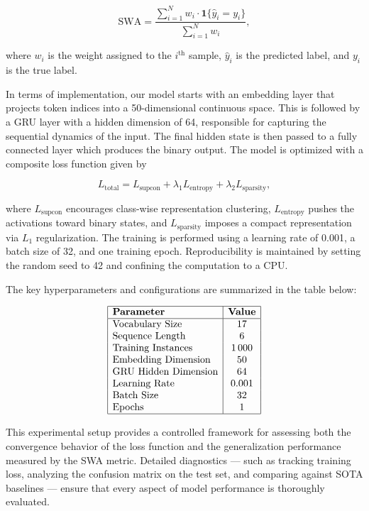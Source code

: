 \documentclass[12pt]{article}
\begin{document}
\[
\text{SWA} = \frac{\sum_{i=1}^{N} w_i \cdot \mathbf{1}\{\hat{y}_i = y_i\}}{\sum_{i=1}^{N} w_i},
\]

where \(w_i\) is the weight assigned to the \(i^\text{th}\) sample, \(\hat{y}_i\) is the predicted label, and \(y_i\) is the true label.

In terms of implementation, our model starts with an embedding layer that projects token indices into a 50-dimensional continuous space. This is followed by a GRU layer with a hidden dimension of 64, responsible for capturing the sequential dynamics of the input. The final hidden state is then passed to a fully connected layer which produces the binary output. The model is optimized with a composite loss function given by

\[
L_{\text{total}} = L_{\text{supcon}} + \lambda_1 L_{\text{entropy}} + \lambda_2 L_{\text{sparsity}},
\]

where \(L_{\text{supcon}}\) encourages class-wise representation clustering, \(L_{\text{entropy}}\) pushes the activations toward binary states, and \(L_{\text{sparsity}}\) imposes a compact representation via \(L_1\) regularization. The training is performed using a learning rate of 0.001, a batch size of 32, and one training epoch. Reproducibility is maintained by setting the random seed to 42 and confining the computation to a CPU.

The key hyperparameters and configurations are summarized in the table below:

\[
\begin{array}{|l|c|}
\hline
\textbf{Parameter} & \textbf{Value} \\
\hline
\text{Vocabulary Size} & 17 \\
\text{Sequence Length} & 6 \\
\text{Training Instances} & 1\,000 \\
\text{Embedding Dimension} & 50 \\
\text{GRU Hidden Dimension} & 64 \\
\text{Learning Rate} & 0.001 \\
\text{Batch Size} & 32 \\
\text{Epochs} & 1 \\
\hline
\end{array}
\]

This experimental setup provides a controlled framework for assessing both the convergence behavior of the loss function and the generalization performance measured by the SWA metric. Detailed diagnostics — such as tracking training loss, analyzing the confusion matrix on the test set, and comparing against SOTA baselines — ensure that every aspect of model performance is thoroughly evaluated.
\end{document}
